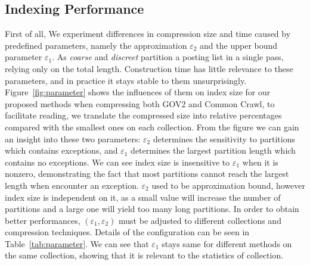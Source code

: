 \documentclass[runningheads]{comsis2}
\begin{document}
\subsection{Indexing Performance}

First of all, We experiment differences in compression size and time caused by predefined parameters, namely the approximation $\varepsilon_{2}$ and the upper bound parameter $\varepsilon_{1}$.
As \textit{coarse} and \textit{discreet} partition a posting list in a single pass, relying only on the total length.
Construction time has little relevance to these parameters, and in practice it stays stable to them unsurprisingly.
Figure~\ref{fig:parameter} shows the influences of them on index size for our proposed methods when compressing both GOV2 and Common Crawl, to facilitate reading, we translate the compressed size into relative percentages compared with the smallest ones on each collection.
From the figure we can gain an insight into these two parameters: $\varepsilon_{2}$ determines the sensitivity to partitions which contains exceptions, and $\varepsilon_{1}$ determines the largest partition length which contains no exceptions.
We can see index size is insensitive to $\varepsilon_{1}$ when it is nonzero, demonstrating the fact that most partitions cannot reach the largest length when encounter an exception.
$\varepsilon_{2}$ used to be approximation bound, however index size is independent on it, as a small value will increase the number of partitions and a large one will yield too many long partitions.
In order to obtain better performances, $ \left( \varepsilon_1,\varepsilon_2 \right) $ must be adjusted to different collections and compression techniques.
Details of the configuration can be seen in Table~\ref{tab:parameter}.
We can see that $ \varepsilon_1 $ stays same for different methods on the same collection, showing that it is relevant to the statistics of collection.
\end{document}
